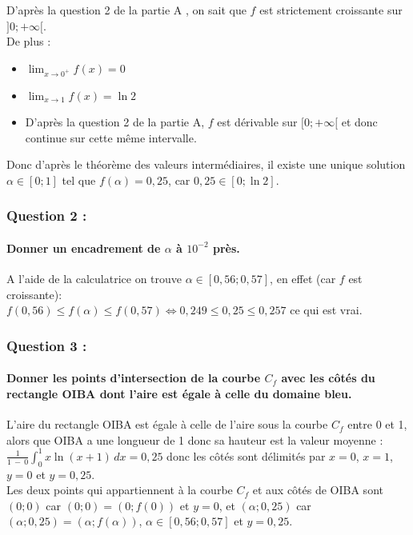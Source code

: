 \documentclass[a4paper, 12pt]{article}
\begin{document}
D'après la question 2 de la partie A , on sait que $f$ est strictement croissante sur $]0;+\infty[$.
\\
De plus : 
\\
\begin{itemize}
    \item[\textbullet] $ \displaystyle \lim_{x \to 0^+}f(x)=0$ \\[1mm]
    \item[\textbullet] $ \displaystyle \lim_{x \to 1}f(x) = \ln{2} $ \\[1mm]
    \item[\textbullet] D'après la question 2 de la partie A, $f$ est dérivable sur $[0;+\infty[$ et donc continue sur cette même intervalle. \\[1mm]
\end{itemize}
Donc d'après le théorème des valeurs intermédiaires, il existe une unique solution $\alpha \in [0;1]$ tel que $f(\alpha) = 0,25$, car $0,25 \in [0;\ln{2}]$.

{}
\subsubsection*{Question 2 :}
\paragraph*{Donner un encadrement de $\alpha$ à $10^{-2}$ près.\\[5mm]}

A l'aide de la calculatrice on trouve $\alpha \in [0,56;0,57]$, en effet (car $f$ est croissante): 
\\
$f(0,56) \leq f(\alpha) \leq f(0,57) \iff 0,249 \leq 0,25 \leq 0,257$ ce qui est vrai.

{}
\subsubsection*{Question 3 :}
\paragraph*{Donner les points d'intersection de la courbe $C_f$ avec les côtés du rectangle OIBA dont l'aire est égale à celle du domaine bleu.\\[5mm]}

L'aire du rectangle OIBA est égale à celle de l'aire sous la courbe $C_f$ entre 0 et 1, alors que OIBA a une longueur de 1 donc sa hauteur est la valeur moyenne :
\\
$\frac{1}{1\ -\ 0}\displaystyle \int_0^1 x\ln{\left(x+1\right)} \,dx = 0,25$ donc les côtés sont délimités par $x=0$, $x=1$, $y=0$ et $y=0,25$.
\\ 
Les deux points qui appartiennent à la courbe $C_f$ et aux côtés de OIBA sont $(0;0)$ car $(0;0) = (0;f(0))$ et $y=0$, 
et $(\alpha;0,25)$ car $(\alpha;0,25) = (\alpha;f(\alpha))$, $\alpha \in[0,56;0,57]$ et $y=0,25$.
\end{document}
